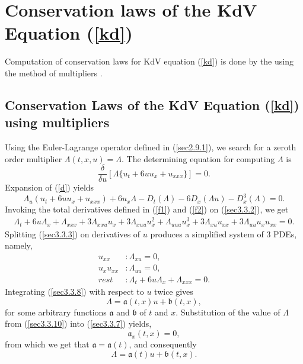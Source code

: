 \section{Conservation laws of the KdV Equation (\ref{kd})}
Computation of conservation laws for KdV equation  (\ref{kd}) is done by  the using the  method of multipliers \citep{olver2000applications}. 
\subsection{Conservation Laws of the KdV Equation (\ref{kd}) using multipliers \label{consl}}
Using  the Euler-Lagrange operator defined  in (\ref{sec2.9.1}), we   search for a zeroth order multiplier \newline $\Lambda(t,x,u)= \Lambda $. The  determining equation for computing $ \Lambda$ is \begin{equation}
\frac{ \delta}{ \delta u} \left[ \Lambda \{  u_t + 6 u u_x + u_{xxx}  \}\right] =0. \label{d}
\end{equation}
Expansion of  (\ref{d}) yields 
\begin{equation}
\Lambda_u ( u_t + 6 u u_x + u_{xxx} ) + 6 u_x \Lambda-D_t (\Lambda)-6D_x(\Lambda u)-D_x^3(\Lambda)=0. \label{sec3.3.2}
\end{equation}
Invoking the total derivatives defined in (\ref{f1}) and (\ref{f2}) on  (\ref{sec3.3.2}), we get
\begin{align}
\Lambda_t + 6 u \Lambda_x + \Lambda_{xxx}+ 3\Lambda_{xxu} u_x +  3 \Lambda_{xuu}   u_x^2 
+ \Lambda_{uuu} u_x^3 + 3 \Lambda_{xu} u_{xx} +  3 \Lambda_{uu}  u_x u_{xx}=0. \label{sec3.3.3} \end{align}
Splitting (\ref{sec3.3.3}) on derivatives of $u$ produces a simplified system of 3 PDEs, namely,
\begin{align}
u_{xx} &: \Lambda_{xu}=0, \label{sec3.3.7} \\
u_x u_{xx}&: \Lambda_{uu}=0, \label{sec3.3.8}\\
rest&:\Lambda_t + 6 u \Lambda_x + \Lambda_{xxx}=0. \label{sec3.3.9}
\end{align}
Integrating (\ref{sec3.3.8})  with respect to $u$ twice gives \begin{equation} \Lambda =  \mathfrak{a}(t,x)u + \mathfrak{b}(t,x),  \label{sec3.3.10} \end{equation}
 for some arbitrary functions $\mathfrak{a}$  and  $\mathfrak{b}$ of  $t$ and $x$.
 Substitution of the value of $\Lambda$ from  (\ref{sec3.3.10})  into  (\ref{sec3.3.7}) yields, \begin{equation}  \mathfrak{a}_x(t,x) =0, \label{aq}
	 \end{equation} from which we get that   $\mathfrak{a}= \mathfrak{a}(t)$, and consequently \begin{equation}
	 \Lambda =  \mathfrak{a}(t)u + \mathfrak{b}(t,x). \label{sec3.3.11}
	 \end{equation}
